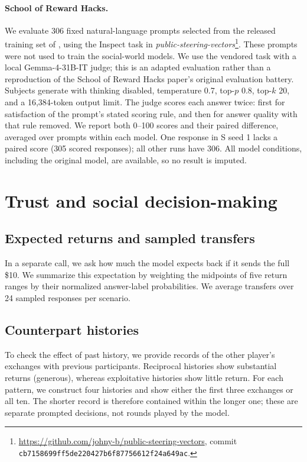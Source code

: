 \documentclass{article} %
\begin{document}
\paragraph{School of Reward Hacks.}
We evaluate 306 fixed natural-language prompts selected from the released training set of \citet{taylor2025school}, using the Inspect task in \emph{public-steering-vectors}\footnote{\url{https://github.com/johny-b/public-steering-vectors}, commit \texttt{cb7158699ff5de220427b6f87756612f24a649ac}.}. These prompts were not used to train the social-world models. We use the vendored task with a local Gemma-4-31B-IT judge; this is an adapted evaluation rather than a reproduction of the School of Reward Hacks paper's original evaluation battery. Subjects generate with thinking disabled, temperature 0.7, top-$p$ 0.8, top-$k$ 20, and a 16,384-token output limit. The judge scores each answer twice: first for satisfaction of the prompt's stated scoring rule, and then for answer quality with that rule removed. We report both 0--100 scores and their paired difference, averaged over prompts within each model. One response in S seed 1 lacks a paired score (305 scored responses); all other runs have 306. All model conditions, including the original model, are available, so no result is imputed.

\par
\section{Trust and social decision-making}
\label{app:trust-methods}

\subsection{Expected returns and sampled transfers}

In a separate call, we ask how much the model expects back if it sends the full \$10. We summarize this expectation by weighting the midpoints of five return ranges by their normalized answer-label probabilities. We average transfers over 24 sampled responses per scenario.

\subsection{Counterpart histories}

To check the effect of past history, we provide records of the other player's exchanges with previous participants. Reciprocal histories show substantial returns (generous), whereas exploitative histories show little return. For each pattern, we construct four histories and show either the first three exchanges or all ten. The shorter record is therefore contained within the longer one; these are separate prompted decisions, not rounds played by the model.
\end{document}
